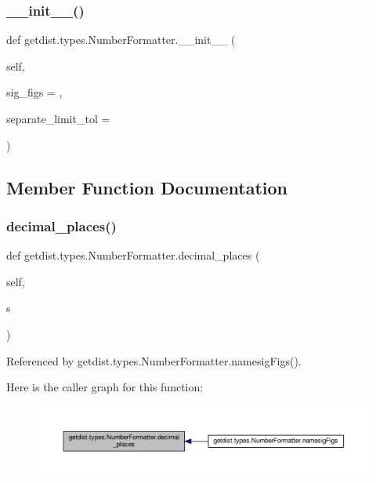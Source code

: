 \subsubsection{\texorpdfstring{\+\_\+\+\_\+init\+\_\+\+\_\+()}{\_\_init\_\_()}}
{\footnotesize\ttfamily def getdist.\+types.\+Number\+Formatter.\+\_\+\+\_\+init\+\_\+\+\_\+ (\begin{DoxyParamCaption}\item[{}]{self,  }\item[{}]{sig\+\_\+figs = {},  }\item[{}]{separate\+\_\+limit\+\_\+tol = {} }\end{DoxyParamCaption})}



\subsection{Member Function Documentation}
\mbox{\label{classgetdist_1_1types_1_1NumberFormatter_a533ae9cd31215f7aef04852ff06b1dcf}} 
\subsubsection{\texorpdfstring{decimal\+\_\+places()}{decimal\_places()}}
{\footnotesize\ttfamily def getdist.\+types.\+Number\+Formatter.\+decimal\+\_\+places (\begin{DoxyParamCaption}\item[{}]{self,  }\item[{}]{s }\end{DoxyParamCaption})}



Referenced by getdist.\+types.\+Number\+Formatter.\+namesig\+Figs().

Here is the caller graph for this function\+:
\nopagebreak
\begin{figure}[H]
\begin{center}
\leavevmode
\includegraphics[width=350pt]{classgetdist_1_1types_1_1NumberFormatter_a533ae9cd31215f7aef04852ff06b1dcf_icgraph}
\end{center}
\end{figure}
\mbox{\label{classgetdist_1_1types_1_1NumberFormatter_a17323aa6fd485dcfe1c120fe7db58243}} 
